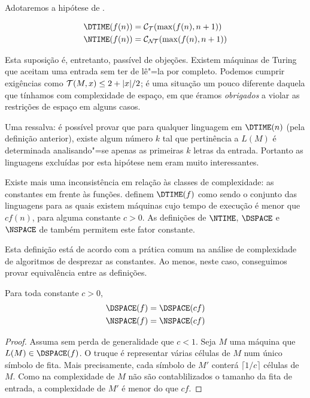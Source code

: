 Adotaremos a hipótese de .
\begin{definition}
    \begin{align*}
        \DTIME(f(n)) &= \mathcal C_\PhiDT(\max(f(n), n+1)) \\
        \NTIME(f(n)) &= \mathcal C_\PhiNT(\max(f(n), n+1))
    \end{align*}
\end{definition}

Esta suposição é,
entretanto,
passível de objeções.
Existem máquinas de Turing
que aceitam uma entrada
sem ter de lê"=la por completo.
Podemos cumprir exigências como
${\mathcal{T}}(M, x) \leq 2 + |x|/2$;
é uma situação um pouco diferente
daquela que tínhamos com complexidade de espaço,
em que éramos \emph{obrigados}
a violar as restrições de espaço
em alguns casos.

Uma ressalva:
é possível provar que
para qualquer linguagem em $\DTIME(n)$
(pela definição anterior),
existe algum número $k$ tal que
pertinência a $L(M)$
é determinada analisando"=se
apenas as primeiras $k$ letras da entrada.
Portanto as linguagens excluídas por esta hipótese
nem eram muito interessantes.

Existe mais uma inconsistência
em relação às classes de complexidade:
as constantes em frente às funções.
definem $\DTIME(f)$ como sendo o conjunto das linguagens
para as quais existem máquinas cujo tempo de execução
é menor que $c f(n)$, para alguma constante $c > 0$.
As definições de $\NTIME$, $\DSPACE$ e $\NSPACE$
de 
também permitem este fator constante.

Esta definição está de acordo com
a prática comum na análise de complexidade de algoritmos
de desprezar as constantes.
Ao menos,
neste caso,
conseguimos provar equivalência entre as definições.

\begin{theorem}
    Para toda constante $c > 0$,
    \begin{align*}
        \DSPACE(f) & = \DSPACE(cf) \\
        \NSPACE(f) & = \NSPACE(cf)
    \end{align*}
\end{theorem}

\begin{proof}
    Assuma sem perda de generalidade que $c < 1$.
    Seja $M$ uma máquina que $L(M) \in \DSPACE(f)$.
    O truque é representar várias células de $M$
    num único símbolo de fita.
    Mais precisamente,
    cada símbolo de $M'$ conterá
    $\lceil 1/c \rceil$ células de $M$.
    Como na complexidade de $M$
    não são contablilizados o tamanho da fita de entrada,
    a complexidade de $M'$ é menor do que $cf$.
\end{proof}

